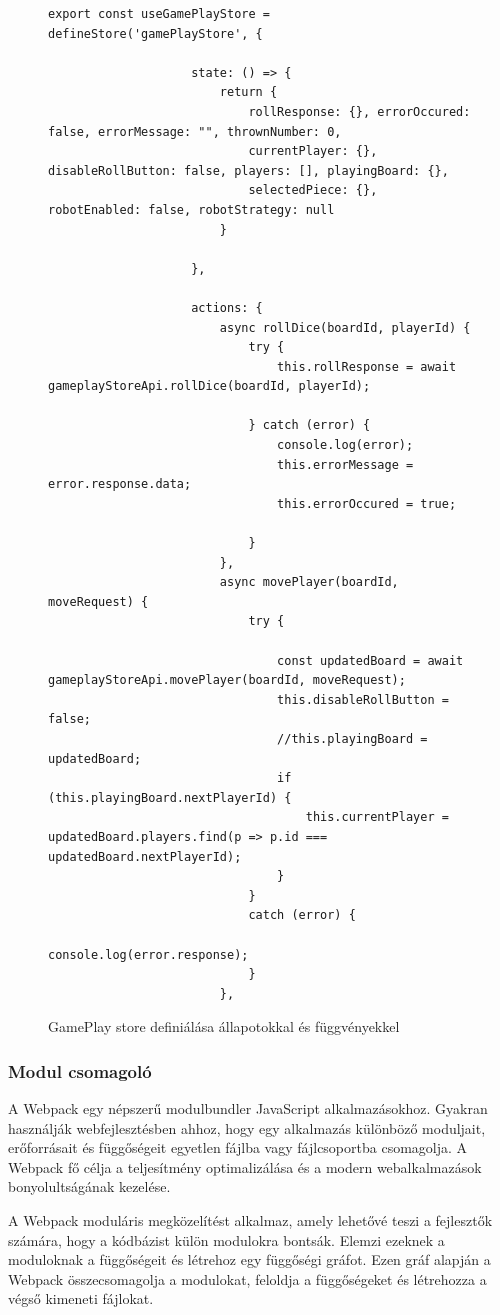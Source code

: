 \documentclass[a4paper,twoside]{article}
\begin{document}
\begin{figure}
	\caption{GamePlay store definiálása állapotokkal és függvényekkel}
	
		\begin{minipage}{\textwidth}
			\begin{lstlisting}[style=javascriptStyle]
				export const useGamePlayStore = defineStore('gamePlayStore', {
					
					state: () => {
						return {
							rollResponse: {}, errorOccured: false, errorMessage: "", thrownNumber: 0,
							currentPlayer: {}, disableRollButton: false, players: [], playingBoard: {},
							selectedPiece: {}, robotEnabled: false, robotStrategy: null
						}
						
					},
					
					actions: {
						async rollDice(boardId, playerId) {
							try {
								this.rollResponse = await gameplayStoreApi.rollDice(boardId, playerId);
								
							} catch (error) {
								console.log(error);
								this.errorMessage = error.response.data;
								this.errorOccured = true;
								
							}
						},
						async movePlayer(boardId, moveRequest) {
							try {
								
								const updatedBoard = await gameplayStoreApi.movePlayer(boardId, moveRequest);
								this.disableRollButton = false;
								//this.playingBoard = updatedBoard;
								if (this.playingBoard.nextPlayerId) {
									this.currentPlayer = updatedBoard.players.find(p => p.id === updatedBoard.nextPlayerId);
								}
							}
							catch (error) {
								console.log(error.response);
							}
						},
			\end{lstlisting}
		\end{minipage}
	
	\label{pinia}
\end{figure}
\subsubsection{Modul csomagoló}

A Webpack\cite{webpack} egy népszerű modulbundler JavaScript alkalmazásokhoz. Gyakran
használják webfejlesztésben ahhoz, hogy egy alkalmazás különböző moduljait,
erőforrásait és függőségeit egyetlen fájlba vagy fájlcsoportba csomagolja. A Webpack fő
célja a teljesítmény optimalizálása és a modern webalkalmazások bonyolultságának
kezelése.

A Webpack moduláris megközelítést alkalmaz, amely lehetővé teszi a fejlesztők számára,
hogy a kódbázist külön modulokra bontsák. Elemzi ezeknek a moduloknak a függőségeit
és létrehoz egy függőségi gráfot. Ezen gráf alapján a Webpack összecsomagolja a
modulokat, feloldja a függőségeket és létrehozza a végső kimeneti fájlokat.
\end{document}
